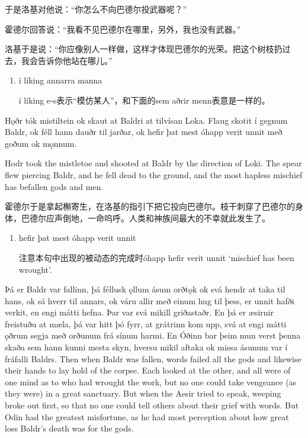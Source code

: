 \begin{translation*}{}
    于是洛基对他说：“你怎么不向巴德尔投武器呢？”

    霍德尔回答说：“我看不见巴德尔在哪里，另外，我也没有武器。”

    洛基于是说：“你应像别人一样做，这样才体现巴德尔的光荣。把这个树枝扔过去，我会告诉你他站在哪儿。”
\end{translation*}
\begin{grammar*}{}
    \begin{enumerate}[leftmargin=*]
        \item í líking annarra manna

              í líking e-s表示“模仿某人”，和下面的sem aðrir menn表意是一样的。
    \end{enumerate}
\end{grammar*}
\begin{paracol}{2}
    Hǫðr tók mistiltein ok skaut at Baldri at tilvísan Loka. Flaug skotit í gegnum Baldr, ok féll hann dauðr til jarðar, ok hefir þat mest óhapp verit unnit með goðum ok mǫnnum.

    \switchcolumn

    Hodr took the mistletoe and shooted at Baldr by the direction of Loki. The spear flew piercing Baldr, and he fell dead to the ground, and the most hapless mischief has befallen gods and men.
\end{paracol}
\begin{translation*}{}
    霍德尔于是拿起槲寄生，在洛基的指引下把它投向巴德尔。枝干刺穿了巴德尔的身体，巴德尔应声倒地，一命呜呼。人类和神族间最大的不幸就此发生了。
\end{translation*}
\begin{grammar*}{}
    \begin{enumerate}[leftmargin=*]
        \item hefir þat mest óhapp verit unnit

              注意本句中出现的被动态的完成时óhapp hefir verit unnit `mischief has been wrought'.
    \end{enumerate}
\end{grammar*}
\begin{paracol}{2}
    Þá er Baldr var fallinn, þá féllusk ǫllum ásum orðtǫk ok svá hendr at taka til hans, ok sá hverr til annars, ok váru allir með einum hug til þess, er unnit hafði verkit, en engi mátti hefna. Þar var svá mikill griðastaðr. En þá er æsirnir freistuðu at mæla, þá var hitt þó fyrr, at grátrinn kom upp, svá at engi mátti ǫðrum segja með orðunum frá sínum harmi. En Óðinn bar þeim mun verst þenna skaða sem hann kunni mesta skyn, hversu mikil aftaka ok missa ásunum var í fráfalli Baldrs.
    \switchcolumn
    Then when Baldr was fallen, words failed all the gods and likewise their hands to lay hold of the corpse. Each looked at the other, and all were of one mind as to who had wrought the work, but no one could take vengeance (as they were) in a great sanctuary. But when the Aesir tried to speak, weeping broke out first, so that no one could tell others about their grief with words. But Odin had the greatest misfortune, as he had most perception about how great loss Baldr's death was for the gods.
\end{paracol}
